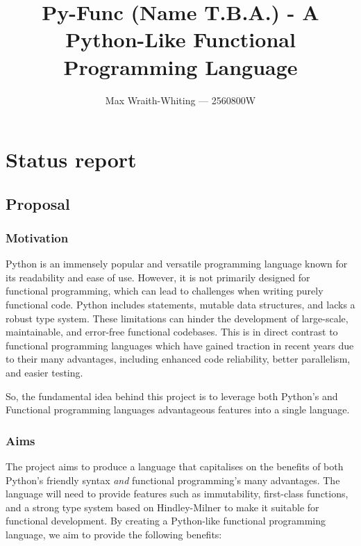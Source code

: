 \documentclass[11pt]{article}
\title{Py-Func (Name T.B.A.) - A Python-Like Functional Programming Language}
\author{Max Wraith-Whiting — 2560800W}
\begin{document}
    \maketitle

\section{Status report}

\subsection{Proposal}\label{proposal}

\subsubsection{Motivation}\label{motivation}

    Python is an immensely popular and versatile programming language known for its readability and ease of use.
    However, it is not primarily designed for functional programming, which can lead to challenges when writing purely functional code.
    Python includes statements, mutable data structures, and lacks a robust type system.
    These limitations can hinder the development of large-scale, maintainable, and error-free functional codebases.
    This is in direct contrast to functional programming languages which have gained traction in recent years due to their many advantages, including enhanced code reliability, better parallelism, and easier testing.

    So, the fundamental idea behind this project is to leverage both Python's and Functional programming languages advantageous features into a single language.
    
\subsubsection{Aims}\label{aims}

    The project aims to produce a language that capitalises on the benefits of both Python's friendly syntax \emph{and} functional programming's many advantages.
    The language will need to provide features such as immutability, first-class functions, and a strong type system based on Hindley-Milner to make it suitable for functional development.
    By creating a Python-like functional programming language, we aim to provide the following benefits:
\end{document}
